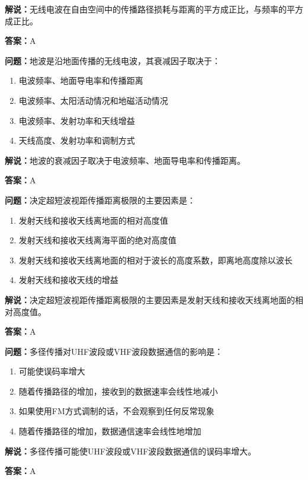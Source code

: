 \textbf{解说：}无线电波在自由空间中的传播路径损耗与距离的平方成正比，与频率的平方成正比。%

\textbf{答案：}A

\textbf{问题：}地波是沿地面传播的无线电波，其衰减因子取决于：

\begin{enumerate}[label=\Alph*), leftmargin=3em]
	\item 电波频率、地面导电率和传播距离
	\item 电波频率、太阳活动情况和地磁活动情况
	\item 电波频率、发射功率和天线增益
	\item 天线高度、发射功率和调制方式
\end{enumerate}

\textbf{解说：}地波的衰减因子取决于电波频率、地面导电率和传播距离。%

\textbf{答案：}A

\textbf{问题：}决定超短波视距传播距离极限的主要因素是：

\begin{enumerate}[label=\Alph*), leftmargin=3em]
	\item 发射天线和接收天线离地面的相对高度值
	\item 发射天线和接收天线离海平面的绝对高度值
	\item 发射天线和接收天线离地面的相对于波长的高度系数，即离地高度除以波长
	\item 发射天线和接收天线的增益
\end{enumerate}

\textbf{解说：}决定超短波视距传播距离极限的主要因素是发射天线和接收天线离地面的相对高度值。%

\textbf{答案：}A

\textbf{问题：}多径传播对UHF波段或VHF波段数据通信的影响是：

\begin{enumerate}[label=\Alph*), leftmargin=3em]
	\item 可能使误码率增大
	\item 随着传播路径的增加，接收到的数据速率会线性地减小
	\item 如果使用FM方式调制的话，不会观察到任何反常现象
	\item 随着传播路径的增加，数据通信速率会线性地增加
\end{enumerate}

\textbf{解说：}多径传播可能使UHF波段或VHF波段数据通信的误码率增大。%

\textbf{答案：}A

